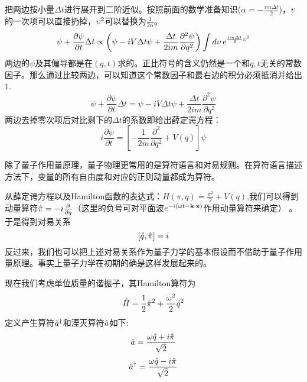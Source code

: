 \documentclass[CJK]{beamer}
\begin{document}
\begin{frame}
\bch
把两边按小量$\Delta t$进行展开到二阶近似。按照前面的数学准备知识($\alpha = -\frac{im\Delta t}{2}$)，$\upsilon$的一次项可以直接扔掉，$\upsilon^2$可以替换为$\frac{1}{2\alpha}$。
$$ \psi + \frac{\partial \psi}{\partial t}\Delta t \propto \left(\psi - iV\Delta t \psi + \frac{\Delta t}{2i m}\frac{\partial^2\psi}{\partial q^2}\right) \int d\upsilon\, e^{\frac{im\Delta t}{2} \upsilon^2}$$
两边的$\psi$及其偏导都是在$(q, t)$求的。正比符号的含义仍然是一个和$q,t$无关的常数因子。那么通过比较两边，可以知道这个常数因子和最右边的积分必须抵消并给出$1$.
$$ \psi + \frac{\partial \psi}{\partial t}\Delta t  = \psi - iV\Delta t \psi + \frac{\Delta t}{2i m}\frac{\partial^2\psi}{\partial q^2}$$
两边去掉零次项后对比剩下的$\Delta t$的系数即给出薛定谔方程：
$$ i\frac{\partial \psi}{\partial t} = \left[-\frac{1}{2m}\frac{\partial^2}{\partial q^2} + V(q)\right] \psi$$
\ech
\end{frame}

\begin{frame}
\bch
除了量子作用量原理，量子物理更常用的是算符语言和对易规则。在算符语言描述方法下，变量的所有自由度和对应的正则动量都成为算符。

\skipline
从薛定谔方程以及Hamilton函数的表达式：$H(\pi, q) = \frac{\pi^2}{2} + V(q)$,我们可以得到动量算符$\hat{\pi} = -i\frac{\partial}{\partial q}$（这里的负号可对平面波$e^{-i(\omega t -\mathbf{k}\cdot\mathbf{x})}$作用动量算符来确定） 。于是得到对易关系
$$[\hat{q}, \hat{\pi}] = i$$
反过来，我们也可以把上述对易关系作为量子力学的基本假设而不借助于量子作用量原理。事实上量子力学在初期的确是这样发展起来的。
\ech
\end{frame}


\begin{frame}
\bch
现在我们考虑单位质量的谐振子，其Hamilton算符为
$$\hat{H} = \frac{1}{2}\hat{\pi}^2 + \frac{\omega^2}{2}\hat{q}^2$$
定义产生算符${\hat{a}^\dagger}$和湮灭算符$\hat{a}$如下:
$$\hat{a} = \frac{\omega\hat{q} + i\hat{\pi}}{\sqrt{2}}$$
$${\hat{a}^\dagger} = \frac{\omega\hat{q} - i\hat{\pi}}{\sqrt{2}}$$

\ech
\end{frame}
\end{document}
